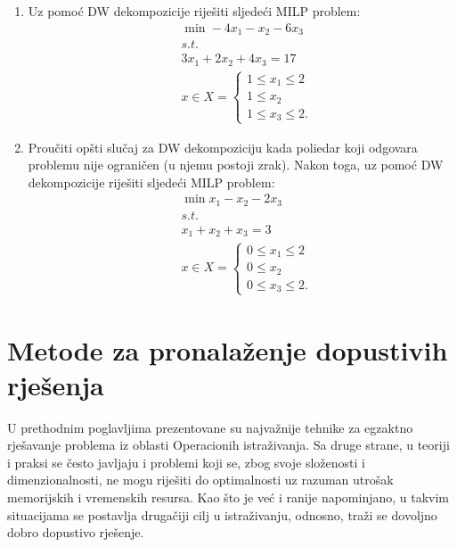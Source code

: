 \documentclass[a4paper, utf8, 11pt, colorlinks]{book}
\begin{document}
\begin{enumerate}
\item %
	Uz pomoć   DW dekompozicije riješiti sljedeći MILP problem:
\begin{align*}
	 &\min -4x_1 - x_2 - 6 x_3 \\
	 & s.t.\\
	 & 3 x_1 + 2 x_2 + 4 x_3 = 17 \\
	 & x \in X = \begin{cases}
	 	1 \leq x_1 \leq 2 \\
	 	1 \leq x_2 \\
	    1 \leq x_3 \leq 2. 
	 \end{cases}
\end{align*}
\item %
    Proučiti opšti slučaj za DW dekompoziciju kada poliedar koji odgovara problemu nije ograničen (u njemu postoji zrak). Nakon toga, uz pomoć DW dekompozicije riješiti sljedeći MILP problem:
	\begin{align*}
		 &\min x_1 - x_2 - 2 x_3 \\
		 & s.t. \\
		 & x_1 + x_2 + x_3 = 3 \\
		 & x \in X = \begin{cases}
		 	        0 \leq x_1 \leq 2 \\
		 	        0 \leq x_2 \\
		 	        0 \leq x_3 \leq 2. 
		 \end{cases}
	\end{align*}

\end{enumerate}



 \chapter{Metode za pronalaženje dopustivih rješenja}
 
 U prethodnim poglavljima prezentovane su najvažnije tehnike za egzaktno rješavanje problema iz oblasti Operacionih istraživanja. Sa druge strane, u teoriji i praksi se često javljaju i problemi koji se, zbog svoje složenosti i dimenzionalnosti, ne mogu riješiti do optimalnosti uz razuman utrošak memorijskih i vremenskih resursa. Kao što je već i ranije napominjano, u takvim situacijama se postavlja drugačiji cilj u istraživanju, odnosno, traži se dovoljno dobro dopustivo rješenje. 
 
\end{document}

